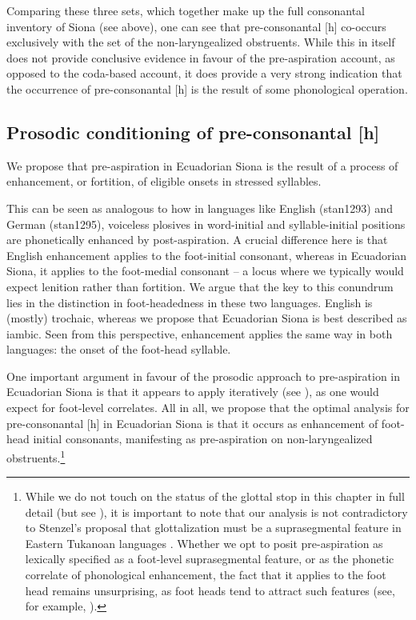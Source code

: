 \documentclass[output=paper]{langscibook}
\begin{document}
Comparing these three sets, which together make up the full consonantal inventory of Siona (see  above), one can see that pre-consonantal [h] co-occurs exclusively with the set of the non-laryngealized obstruents. While this in itself does not provide conclusive evidence in favour of the pre-aspiration account, as opposed to the coda-based account, it does provide a very strong indication that the occurrence of pre-consonantal [h] is the result of some phonological operation. 

\subsection{Prosodic conditioning of pre-consonantal [h]}
We propose that pre-aspiration in Ecuadorian Siona is the result of a process of enhancement, or fortition, of eligible onsets in stressed syllables.

This can be seen as analogous to how in languages like English (stan1293) and German (stan1295), voiceless plosives in word-initial and syllable-initial positions are phonetically enhanced by post-aspiration. A crucial difference here is that English enhancement applies to the foot-initial consonant, whereas in Ecuadorian Siona, it applies to the foot-medial consonant -- a locus where we typically would expect lenition rather than fortition. We argue that the key to this conundrum lies in the distinction in foot-headedness in these two languages. English is (mostly) trochaic, whereas we propose that Ecuadorian Siona is best described as iambic. Seen from this perspective, enhancement applies the same way in both languages: the onset of the foot-head syllable. 

One important argument in favour of the prosodic approach to pre-aspiration in Ecuadorian Siona is that it appears to apply iteratively (see ), as one would expect for foot-level correlates. All in all, we propose that the optimal analysis for pre-consonantal [h] in Ecuadorian Siona is that it occurs as enhancement of foot-head initial consonants, manifesting as pre-aspiration on non-laryngealized obstruents.\footnote{While we do not touch on the status of the glottal stop in this chapter in full detail (but see ), it is important to note that  our analysis is not contradictory to Stenzel's proposal that glottalization must be a suprasegmental feature in Eastern Tukanoan languages \citep{Stenzel:2007}. Whether we opt to posit pre-aspiration as lexically specified as a foot-level suprasegmental feature, or as the phonetic correlate of phonological enhancement, the fact that it applies to the foot head remains unsurprising, as foot heads tend to attract such features (see, for example, \citealt{Harris:1997}).}
\end{document}
